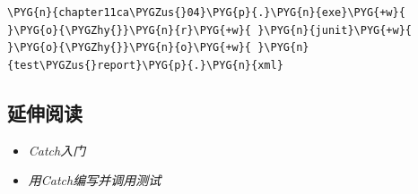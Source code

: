
\begin{codeblockbg}
\begin{Verbatim}[commandchars=\\\{\},breaklines=true,breakanywhere=true,fontsize=\codefont,xleftmargin=17bp]
\PYG{n}{chapter11ca\PYGZus{}04}\PYG{p}{.}\PYG{n}{exe}\PYG{+w}{ }\PYG{o}{\PYGZhy{}}\PYG{n}{r}\PYG{+w}{ }\PYG{n}{junit}\PYG{+w}{ }\PYG{o}{\PYGZhy{}}\PYG{n}{o}\PYG{+w}{ }\PYG{n}{test\PYGZus{}report}\PYG{p}{.}\PYG{n}{xml}
\end{Verbatim}
\end{codeblockbg}



\subsection{延伸阅读}



\begin{itemize}
\item \textit{Catch入门}



\item \textit{用Catch编写并调用测试}

\end{itemize}
